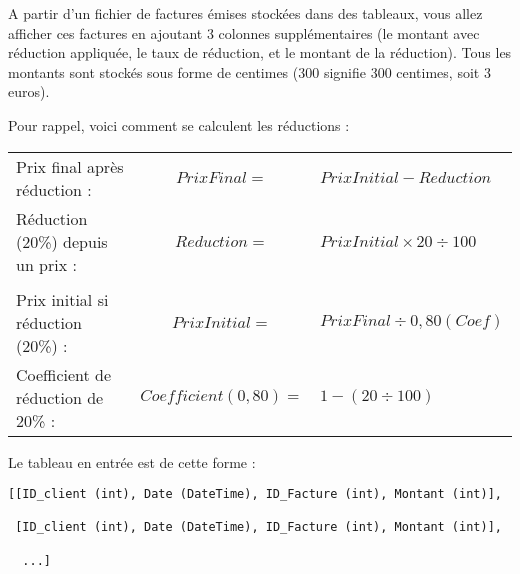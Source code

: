 

\vspace*{0.7cm}

\noindent {}

\bigskip

\noindent A partir d'un fichier de factures émises stockées dans des tableaux, vous allez afficher ces factures en ajoutant 3 colonnes supplémentaires (le montant avec réduction appliquée, le taux de réduction, et le montant de la réduction).
Tous les montants sont stockés sous forme de centimes (300 signifie 300 centimes, soit 3 euros).

\bigskip

\noindent Pour rappel, voici comment se calculent les réductions :\\

\begin{tabular}{l c l}
Prix final après réduction : & $ Prix Final = $ & $ Prix Initial - Reduction $ \\
Réduction (20\%) depuis un prix : & $ Reduction = $ & $ Prix Initial \times 20 \div 100 $ \\
 & & \\
Prix initial si réduction (20\%) : & $ Prix Initial = $ & $ Prix Final \div 0,80 (Coef) $ \\
Coefficient de réduction de 20\% : & $ Coefficient (0,80) = $ & $ 1 - (20 \div 100) $ \\
\end{tabular}

\bigskip

\bigskip

\noindent Le tableau en entrée est de cette forme : \\

\lstset{language=sh}
\begin{lstlisting}[frame=single,title={Tableau en entrée}]
[[ID_client (int), Date (DateTime), ID_Facture (int), Montant (int)],

 [ID_client (int), Date (DateTime), ID_Facture (int), Montant (int)],

  ...]
\end{lstlisting}

